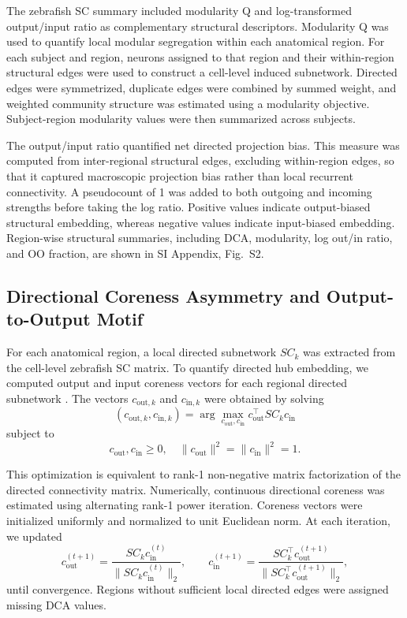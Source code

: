 \documentclass[9pt,twocolumn,twoside]{pnas-new}
\begin{document}
{The zebrafish SC summary included modularity Q and log-transformed output/input ratio as complementary structural descriptors. Modularity Q was used to quantify local modular segregation within each anatomical region. For each subject and region, neurons assigned to that region and their within-region structural edges were used to construct a cell-level induced subnetwork. Directed edges were symmetrized, duplicate edges were combined by summed weight, and weighted community structure was estimated using a modularity objective. Subject-region modularity values were then summarized across subjects.

The output/input ratio quantified net directed projection bias. This measure was computed from inter-regional structural edges, excluding within-region edges, so that it captured macroscopic projection bias rather than local recurrent connectivity. A pseudocount of 1 was added to both outgoing and incoming strengths before taking the log ratio. Positive values indicate output-biased structural embedding, whereas negative values indicate input-biased embedding. 
Region-wise structural summaries, including DCA, modularity, log out/in ratio, and OO fraction, are shown in SI Appendix, Fig.~S2.


\subsection*{Directional Coreness Asymmetry and Output-to-Output Motif}

For each anatomical region, a local directed subnetwork $SC_k$ was extracted from the cell-level zebrafish SC matrix. To quantify directed hub embedding, we computed output and input coreness vectors for each regional directed subnetwork \citep{borgatti2000models,Borgatti2006Centrality,winding2023connectome}. The vectors $c_{\mathrm{out},k}$ and $c_{\mathrm{in},k}$ were obtained by solving
\[
(c_{\mathrm{out},k}, c_{\mathrm{in},k}) =
\arg\max_{c_{\mathrm{out}},c_{\mathrm{in}}}
c_{\mathrm{out}}^{\top} SC_k c_{\mathrm{in}}
\]
subject to
\[
c_{\mathrm{out}},c_{\mathrm{in}} \ge 0,\quad
\|c_{\mathrm{out}}\|^2 = \|c_{\mathrm{in}}\|^2 = 1 .
\]

This optimization is equivalent to rank-1 non-negative matrix factorization of the directed connectivity matrix. Numerically, continuous directional coreness was estimated using alternating rank-1 power iteration. Coreness vectors were initialized uniformly and normalized to unit Euclidean norm. At each iteration, we updated
\[
c_{\mathrm{out}}^{(t+1)}
=
\frac{SC_k c_{\mathrm{in}}^{(t)}}{\|SC_k c_{\mathrm{in}}^{(t)}\|_2},
\qquad
c_{\mathrm{in}}^{(t+1)}
=
\frac{SC_k^\top c_{\mathrm{out}}^{(t+1)}}{\|SC_k^\top c_{\mathrm{out}}^{(t+1)}\|_2},
\]
until convergence. Regions without sufficient local directed edges were assigned missing DCA values.

}
\end{document}
